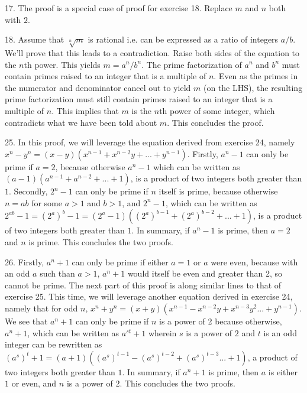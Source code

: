 \documentclass{article}
\begin{document}
17. The proof is a special case of proof for exercise 18. Replace $m$ and $n$ both with $2$.

18. Assume that $\sqrt[n]{m}$ is rational i.e. can be expressed as a ratio of integers $a / b$. We'll prove that this leads to a contradiction. Raise both sides of the equation to the $n$th power. This yields $m = a^n / b^n$. The prime factorization of $a^n$ and $b^n$ must contain primes raised to an integer that is a multiple of $n$. Even as the primes in the numerator and denominator cancel out to yield $m$ (on the LHS), the resulting prime factorization must still contain primes raised to an integer that is a multiple of $n$. This implies that $m$ is the $n$th power of some integer, which contradicts what we have been told about $m$. This concludes the proof.

25. In this proof, we will leverage the equation derived from exercise 24, namely $x^n - y^n = (x - y)(x^{n - 1} + x^{n - 2}y + ... + y^{n - 1})$. Firstly, $a^n - 1$ can only be prime if $a = 2$, because otherwise $a^n - 1$ which can be written as $(a - 1)(a^{n - 1} + a^{n - 2} + ... + 1)$, is a product of two integers both greater than $1$. Secondly, $2^n - 1$ can only be prime if $n$ itself is prime, because otherwise $n = ab$ for some $a > 1$ and $b > 1$, and $2^n - 1$, which can be written as $2^{ab} - 1 = (2^a)^b - 1 = (2^a - 1)((2^a)^{b - 1} + (2^a)^{b - 2} + ... + 1)$, is a product of two integers both greater than $1$. In summary, if $a^n - 1$ is prime, then $a = 2$ and $n$ is prime. This concludes the two proofs.

26. Firstly, $a^n + 1$ can only be prime if either $a = 1$ or $a$ were even, because with an odd $a$ such than $a > 1$, $a^n + 1$ would itself be even and greater than 2, so cannot be prime. The next part of this proof is along similar lines to that of exercise 25. This time, we will leverage another equation derived in exercise 24, namely that for odd $n$, $x^n + y^n = (x + y)(x^{n - 1} - x^{n - 2}y + x^{n - 3}y^2 ... + y^{n - 1})$. We see that $a^n + 1$ can only be prime if $n$ is a power of 2 because otherwise, $a^n + 1$, which can be written as $a^{st} + 1$ wherein $s$ is a power of $2$ and $t$ is an odd integer can be rewritten as $(a^s)^t + 1 = (a + 1)((a^s)^{t - 1} - (a^s)^{t - 2} + (a^s)^{t - 3} ... + 1)$, a product of two integers both greater than $1$. In summary, if $a^n + 1$ is prime, then $a$ is either $1$ or even, and $n$ is a power of $2$. This concludes the two proofs.
\end{document}
